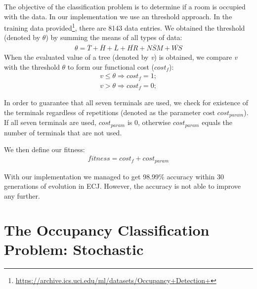 The objective of the classification problem is to determine if a room is occupied with the data. In our implementation we use an threshold approach. In the training data provided\footnote{\url{https://archive.ics.uci.edu/ml/datasets/Occupancy+Detection+}}, there are 8143 data entries. We obtained the threshold (denoted by $\theta$) by summing the means of all types of data:
\begin{align*}
\theta = \overline{T} + \overline{H} + \overline{L} + \overline{HR} + \overline{NSM} + \overline{WS}
\end{align*}
When the evaluated value of a tree (denoted by \emph{v}) is obtained, we compare \emph{v} with the threshold $\theta$ to form our functional cost ($cost_f$):
\begin{align*}
v \leq \theta \Rightarrow cost_f = 1;\\
v > \theta \Rightarrow cost_f = 0;
\end{align*}

In order to guarantee that all seven terminals are used, we check for existence of the terminals regardless of repetitions (denoted as the parameter cost $cost_{param}$). If all seven terminals are used, $cost_{param}$ is 0, otherwise $cost_{param}$ equals the number of terminals that are not used. 

We then define our fitness:
\begin{align*}
fitness = cost_f + cost_{param}
\end{align*}

With our implementation we managed to get 98.99\% accuracy within 30 generations of evolution in ECJ. However, the accuracy is not able to improve any further.

\section{The Occupancy Classification Problem: Stochastic}

